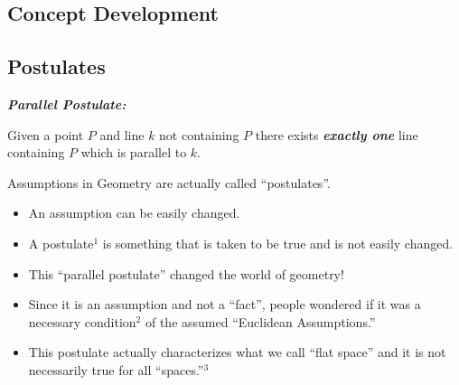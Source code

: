 \documentclass{tufte-handout}
\begin{document}
\begin{tcolorbox}[enhanced jigsaw,breakable,pad at break*=1mm,
  colback=cyan!2!white,colframe=blue!75!black,title=Student View: Slide 7,drop fuzzy shadow,watermark color=white,watermark text=\arabic{tcbbreakpart}]
  \section{Concept Development}\subsection{Postulates}
  \begin{tcolorbox}[colback=blue!4]
  \textbf{\textit{Parallel Postulate:}}
  
  Given a point $P$ and line $k$ not containing $P$ there exists \textbf{\textit{exactly one}} line containing $P$ which is parallel to $k.$
    
  \end{tcolorbox}
  
  Assumptions in Geometry are actually called ``postulates''. 
  
  \begin{itemize}
      \item An assumption can be easily changed.
      \item A postulate$^1$ is something that is taken to be true and is not easily changed.
      \item This ``parallel postulate'' changed the world of geometry!
      \item Since it is an assumption and not a ``fact'', people wondered if it was a necessary condition$^2$ of the assumed ``Euclidean Assumptions.''
      \item This postulate actually characterizes what we call ``flat space'' and it is not necessarily true for all ``spaces.''$^3$
      
  \end{itemize}
  
  
  
 
\end{tcolorbox}

\pagebreak
\end{document}
